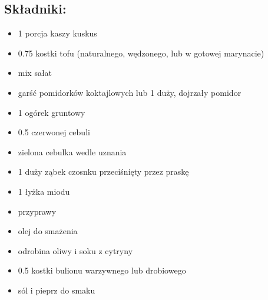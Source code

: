 \documentclass[a4paper,10pt]{book}
\begin{document}
\begin{multicols}{2}

\section*{Składniki:}
\begin{itemize}
    \item 1 porcja kaszy kuskus
    \item 0.75 kostki tofu (naturalnego, wędzonego, lub w gotowej marynacie)
    \item mix sałat  
    \item garść pomidorków koktajlowych lub 1 duży, dojrzały pomidor
    \item 1 ogórek gruntowy 
    \item 0.5 czerwonej cebuli
    \item zielona cebulka wedle uznania 
    \item 1 duży ząbek czosnku przeciśnięty przez praskę 
    \item 1 łyżka miodu
    \item przyprawy
    \item olej do smażenia
    \item odrobina oliwy i soku z cytryny
    \item 0.5 kostki bulionu warzywnego lub drobiowego
    \item sól i pieprz do smaku

\end{itemize}

\columnbreak

\begin{figure}[H]
    \centering
\end{figure}
\end{multicols}
\end{document}
